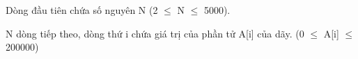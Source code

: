 Dòng đầu tiên chứa số nguyên N (2  $\le$  N  $\le$  5000).  

   N dòng tiếp theo, dòng thứ i chứa giá trị của phần tử A[i] của dãy. (0  $\le$  A[i]  $\le$  200000)